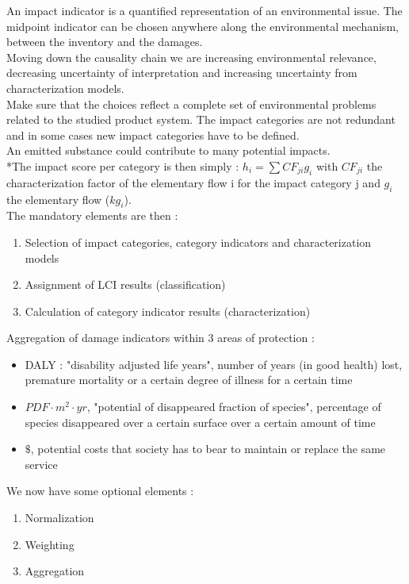 \documentclass[../main.tex]{subfiles}
\begin{document}
An impact indicator is a quantified representation of an environmental issue. The midpoint indicator can be chosen anywhere along the environmental mechanism, between the inventory and the damages.\\
Moving down the causality chain we are increasing environmental relevance, decreasing uncertainty of interpretation and increasing uncertainty from characterization models.\\

Make sure that the choices reflect a complete set of environmental problems related to the studied product system. The impact categories are not redundant and in some cases new impact categories have to be defined.\\
An emitted substance could contribute to many potential impacts.\\
*The impact score per category is then simply : $h_i = \sum CF_{ji} g_i$ with $CF_{ji}$ the characterization factor of the elementary flow i for the impact category j and $g_i$ the elementary flow ($kg_i$).\\
The mandatory elements are then : \begin{enumerate}
    \item Selection of impact categories, category indicators and characterization models
    \item Assignment of LCI results (classification)
    \item Calculation of category indicator results (characterization)
\end{enumerate}

Aggregation of damage indicators within 3 areas of protection : \begin{itemize}
    \item DALY : "disability adjusted life years", number of years (in good health) lost, premature mortality or a certain degree of illness for a certain time
    \item $PDF \cdot m^2 \cdot yr$, "potential of disappeared fraction of species", percentage of species disappeared over a certain surface over a certain amount of time
    \item $\$$, potential costs that society has to bear to maintain or replace the same service
\end{itemize}


We now have some optional elements : \begin{enumerate}
    \item Normalization
    \item Weighting
    \item Aggregation
\end{enumerate}
\end{document}
